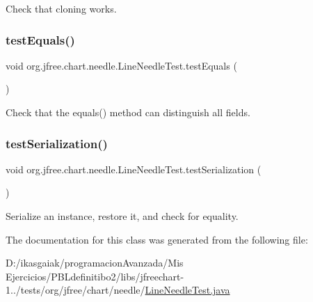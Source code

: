Check that cloning works. \mbox{\label{classorg_1_1jfree_1_1chart_1_1needle_1_1_line_needle_test_ae53166193e62d8a4f6361dfe5c8140cd}} 
\subsubsection{\texorpdfstring{test\+Equals()}{testEquals()}}
{\footnotesize\ttfamily void org.\+jfree.\+chart.\+needle.\+Line\+Needle\+Test.\+test\+Equals (\begin{DoxyParamCaption}{ }\end{DoxyParamCaption})}

Check that the equals() method can distinguish all fields. \mbox{\label{classorg_1_1jfree_1_1chart_1_1needle_1_1_line_needle_test_a58cfc5fdea906cdb7be5531020ddd9d2}} 
\subsubsection{\texorpdfstring{test\+Serialization()}{testSerialization()}}
{\footnotesize\ttfamily void org.\+jfree.\+chart.\+needle.\+Line\+Needle\+Test.\+test\+Serialization (\begin{DoxyParamCaption}{ }\end{DoxyParamCaption})}

Serialize an instance, restore it, and check for equality. 

The documentation for this class was generated from the following file\+:\begin{DoxyCompactItemize}
\item 
D\+:/ikasgaiak/programacion\+Avanzada/\+Mis Ejercicios/\+P\+B\+Ldefinitibo2/libs/jfreechart-\/1../tests/org/jfree/chart/needle/\mbox{\hyperlink{_line_needle_test_8java}{Line\+Needle\+Test.\+java}}\end{DoxyCompactItemize}
